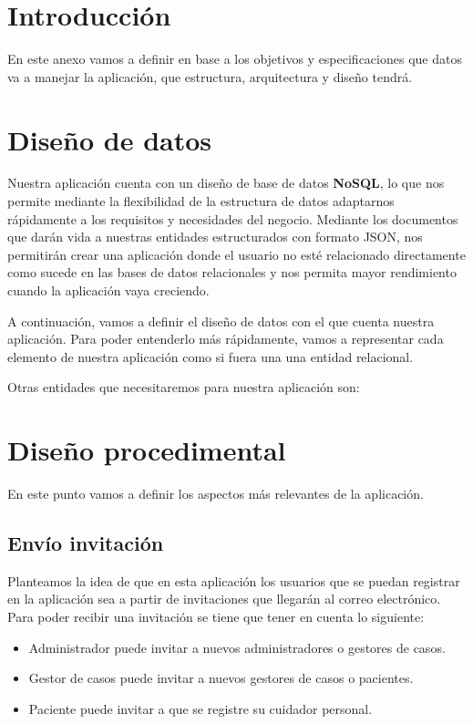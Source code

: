 
\section{Introducción}
En este anexo vamos a definir en base a los objetivos y especificaciones que datos va a manejar la aplicación, que estructura, arquitectura y diseño tendrá.

\section{Diseño de datos}
Nuestra aplicación cuenta con un diseño de base de datos \textbf{NoSQL}, lo que nos permite mediante la flexibilidad de la estructura de datos adaptarnos rápidamente a los requisitos y necesidades del negocio. Mediante los documentos que darán vida a nuestras entidades estructurados con formato JSON, nos permitirán crear una aplicación donde el usuario no esté relacionado directamente como sucede en las bases de datos relacionales y nos permita mayor rendimiento cuando la aplicación vaya creciendo.

A continuación, vamos a definir el diseño de datos con el que cuenta nuestra aplicación. Para poder entenderlo más rápidamente, vamos a representar cada elemento de nuestra aplicación como si fuera una una entidad relacional.
 
Otras entidades que necesitaremos para nuestra aplicación son:

\section{Diseño procedimental}
En este punto vamos a definir los aspectos más relevantes de la aplicación.

\subsection{Envío invitación}
Planteamos la idea de que en esta aplicación los usuarios que se puedan registrar en la aplicación sea a partir de invitaciones que llegarán al correo electrónico. Para poder recibir una invitación se tiene que tener en cuenta lo siguiente:
\begin{itemize}
	\item Administrador puede invitar a nuevos administradores o gestores de casos.
	\item Gestor de casos puede invitar a nuevos gestores de casos o pacientes.
	\item Paciente puede invitar a que se registre su cuidador personal.
\end{itemize}

